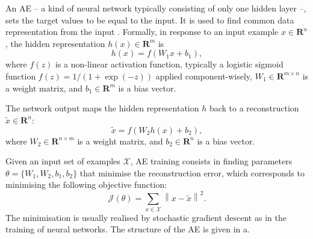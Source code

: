 
An AE -- a kind of neural network typically consisting of only one hidden layer --, sets the target values to be equal to the input. It is used to find common data representation from the input \cite{Goodfellow2009-MII,Bengio2007-GLT}. Formally, in response to an input example $x\in \mathbf{R}^{n}$, the hidden representation
$h(x) \in \mathbf{R}^{m}$ is 
\begin{equation} %
h(x) = f(W_{1}x +b_{1}), 
\end{equation}
where $f(z)$ is a non-linear activation function, typically a logistic
sigmoid function $f(z) = 1/(1+\exp(-z)) $ applied component-wisely,
$W_{1} \in \mathbf{R}^{m \times n}$ is a weight matrix, and $b_{1} \in
\mathbf{R}^{m}$ is a bias vector.

The network output maps the hidden representation $h$ back to a
reconstruction $\tilde{x} \in \mathbf{R}^{n}$:
\begin{equation} %
\tilde{x} = f(W_{2}h(x) +b_{2}), 
\end{equation}
where $W_{2} \in \mathbf{R}^{n \times m}$ is a weight matrix, and $b_{2} \in
\mathbf{R}^{n}$ is a bias vector.

Given an input set of examples $\mathcal{X}$, AE training consists
in finding parameters $\theta=\{W_{1},W_{2},b_{1},b_{2}\}$ that
minimise the reconstruction error, which corresponds to minimising
the following objective function:
\begin{equation} %
\mathcal{J}(\theta)=\sum_{x\in{\mathcal{X}}}\left\| x -
\tilde{x}\right\|^{2}.
\end{equation}
The minimisation is usually realised by stochastic gradient descent as
in the training of neural networks. The structure of the AE is given in a.   




